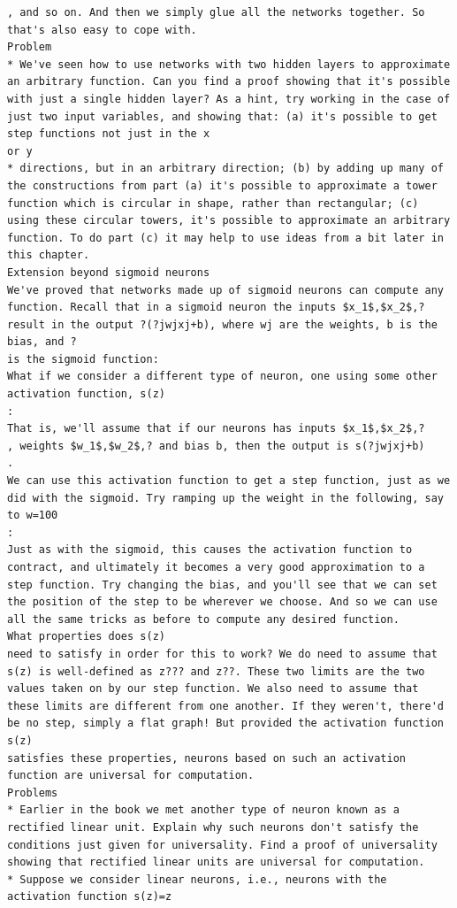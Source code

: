 \begin{lstlisting}
, and so on. And then we simply glue all the networks together. So that's also easy to cope with.
Problem
* We've seen how to use networks with two hidden layers to approximate an arbitrary function. Can you find a proof showing that it's possible with just a single hidden layer? As a hint, try working in the case of just two input variables, and showing that: (a) it's possible to get step functions not just in the x
or y
* directions, but in an arbitrary direction; (b) by adding up many of the constructions from part (a) it's possible to approximate a tower function which is circular in shape, rather than rectangular; (c) using these circular towers, it's possible to approximate an arbitrary function. To do part (c) it may help to use ideas from a bit later in this chapter.
Extension beyond sigmoid neurons
We've proved that networks made up of sigmoid neurons can compute any function. Recall that in a sigmoid neuron the inputs $x_1$,$x_2$,?
result in the output ?(?jwjxj+b), where wj are the weights, b is the bias, and ?
is the sigmoid function:
What if we consider a different type of neuron, one using some other activation function, s(z)
:
That is, we'll assume that if our neurons has inputs $x_1$,$x_2$,?
, weights $w_1$,$w_2$,? and bias b, then the output is s(?jwjxj+b)
.
We can use this activation function to get a step function, just as we did with the sigmoid. Try ramping up the weight in the following, say to w=100
:
Just as with the sigmoid, this causes the activation function to contract, and ultimately it becomes a very good approximation to a step function. Try changing the bias, and you'll see that we can set the position of the step to be wherever we choose. And so we can use all the same tricks as before to compute any desired function.
What properties does s(z)
need to satisfy in order for this to work? We do need to assume that s(z) is well-defined as z??? and z??. These two limits are the two values taken on by our step function. We also need to assume that these limits are different from one another. If they weren't, there'd be no step, simply a flat graph! But provided the activation function s(z)
satisfies these properties, neurons based on such an activation function are universal for computation.
Problems
* Earlier in the book we met another type of neuron known as a rectified linear unit. Explain why such neurons don't satisfy the conditions just given for universality. Find a proof of universality showing that rectified linear units are universal for computation.
* Suppose we consider linear neurons, i.e., neurons with the activation function s(z)=z

\end{lstlisting}
